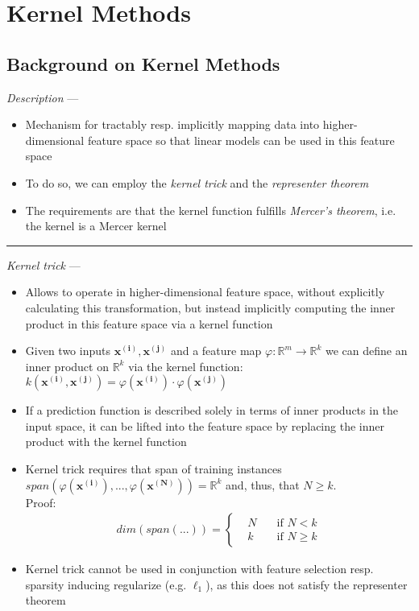 \section{Kernel Methods}
\subsection*{Background on Kernel Methods}
\emph{Description} ---
\begin{itemize}
    \item Mechanism for tractably resp. implicitly mapping data into higher-dimensional feature space so that linear models can be used in this feature space
    \item To do so, we can employ the \emph{kernel trick} and the \emph{representer theorem}
    \item The requirements are that the kernel function fulfills \emph{Mercer's theorem}, i.e. the kernel is a Mercer kernel
\end{itemize}

{\color{lightgray}\hrule height 0.001mm}

\emph{Kernel trick} ---
\begin{itemize}
    \item Allows to operate in higher-dimensional feature space, without explicitly calculating this transformation, but instead implicitly computing the inner product in this feature space via a kernel function
    \item Given two inputs $\boldsymbol{x^{(i)}}, \boldsymbol{x^{(j)}}$ and a feature map $\varphi: \mathbb{R}^m \rightarrow \mathbb{R}^k$ we can define an inner product on $\mathbb{R}^k$ via the kernel function: $k(\boldsymbol{x^{(i)}}, \boldsymbol{x^{(j)}}) = \varphi(\boldsymbol{x^{(i)}}) \cdot \varphi(\boldsymbol{x^{(j)}})$
    \item If a prediction function is described solely in terms of inner products in the input space, it can be lifted into the feature space by replacing the inner product with the kernel function
    \item Kernel trick requires that span of training instances  $span(\varphi(\boldsymbol{x^{(i)}}), ..., \varphi(\boldsymbol{x^{(N)}})) = \mathbb{R}^k$ and, thus, that $N \geq k$.\\
    Proof:
    \begin{align*}
    dim(span(...)) = 
    \left\{
        \begin{aligned}
             & N \quad & \text{if } N < k \\
             & k \quad & \text{if } N \geq k
        \end{aligned}
    \right.
    \end{align*}
    \item Kernel trick cannot be used in conjunction with feature selection resp. sparsity inducing regularize (e.g. $\ell_1$), as this does not satisfy the representer theorem
\end{itemize}

